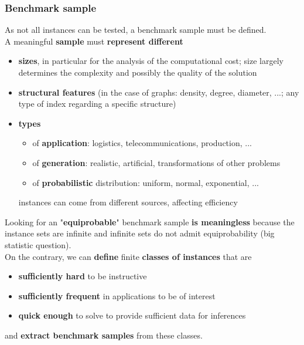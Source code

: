 \documentclass[11pt]{article}
\begin{document}
	\newpage
	
	\subsubsection{Benchmark sample}
	As not all instances can be tested, a benchmark sample must be defined.\\
	
	A meaningful \textbf{sample} must \textbf{represent different}
	\begin{itemize}
		\item \textbf{sizes}, in particular for the analysis of the computational cost; size largely determines the complexity and possibly the quality of the solution
		\item \textbf{structural features} (in the case of graphs: density, degree, diameter, ...; any type of index regarding a specific structure)
		\item \textbf{types}
		\begin{itemize}
			\item of \textbf{application}: logistics, telecommunications, production, ...
			\item of \textbf{generation}: realistic, artificial, transformations of other problems
			\item of \textbf{probabilistic} distribution: uniform, normal, exponential, ...
		\end{itemize}
		instances can come from different sources, affecting efficiency
	\end{itemize}
	
	Looking for an "\textbf{equiprobable}" benchmark sample \textbf{is meaningless} because the instance sets are infinite and infinite sets do not admit equiprobability (big statistic question).\\
	
	On the contrary, we can \textbf{define} finite \textbf{classes of instances} that are
	\begin{itemize}
		\item \textbf{sufficiently hard} to be instructive
		\item \textbf{sufficiently frequent} in applications to be of interest
		\item \textbf{quick enough} to solve to provide sufficient data for inferences
	\end{itemize}
	and \textbf{extract benchmark samples} from these classes.
	
	\newpage
	
\end{document}
